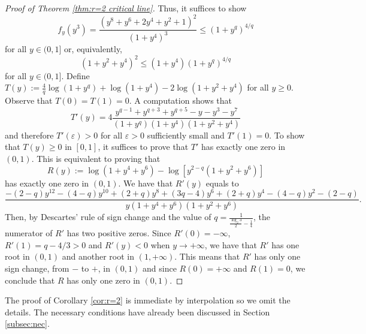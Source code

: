 \documentclass[reqno, 10pt]{amsart}
\theoremstyle{plain}
\numberwithin{equation}{section}
\theoremstyle{definition}
\newtheorem*{induction hypothesis}{Induction hypothesis}
\theoremstyle{remark}
\begin{document}
\begin{proof}[Proof of Theorem \ref{thm:r=2 critical line}]
Thus, it suffices to show
$$
f_y(y^3)=\frac{(y^8+y^6+2y^4+y^2+1)^{2}}{(1+y^4)^{3}}\leq (1+y^{q})^{4/q}
$$
for all $y \in (0,1]$ or, equivalently,
$$
(1+y^2+y^4)^2\leq (1+y^4)(1+y^{q})^{4/q}
$$
for all $y\in(0,1]$. Define $T(y):=\frac{4}{q}\log(1+y^q)+\log(1+y^4)-2\log(1+y^2+y^4)$
for all $y\geq0$. Observe that $T(0)=T(1)=0$. A computation shows that
\begin{equation*}
T'(y)=4\frac{y^{q-1}+y^{q+3}+y^{q+5}-y-y^3-y^7}{(1+y^q)(1+y^4)(1+y^2+y^4)}   
\end{equation*}
and therefore $T'(\varepsilon)>0$ for all $\varepsilon>0$ sufficiently small and $T'(1)=0$. To show that $T(y)\geq 0$ in $[0,1]$, it suffices to prove that $T'$ has exactly one zero in $(0,1)$. This is equivalent to proving that
$$
R(y):=\log(1+y^4+y^6)-\log[y^{2-q}(1+y^2+y^6)]
$$
has exactly one zero in $(0,1)$. We have that $R'(y)$ equals to
$$
\frac{-(2-q)y^{12}-(4-q)y^{10}+(2+q)y^8+(3q-4)y^6+(2+q)y^4-(4-q)y^2-(2-q)}{y(1+y^4+y^6)(1+y^2+y^6)}.
$$
Then, by Descartes' rule of sign change and the value of $q=\frac{1}{\frac{\log_2 3}{2} - \frac{1}{4}}$, the numerator of $R'$ has two positive zeros. Since $R'(0) = -\infty$, $R'(1)=q-4/3>0$ and  $R'(y)<0$ when $y \to +\infty$, we have that $R'$ has one root in $(0,1)$ and another root in $(1,+\infty)$. This means that $R'$ has only one sign change, from $-$ to $+$, in $(0,1)$ and since $R(0)=+\infty$ and $R(1)=0$, we conclude that $R$ has only one zero in $(0,1)$.
\end{proof}

The proof of Corollary \ref{cor:r=2} is immediate by interpolation so we omit the details. The necessary conditions have already been discussed in Section \ref{subsec:nec}.












\end{document}
